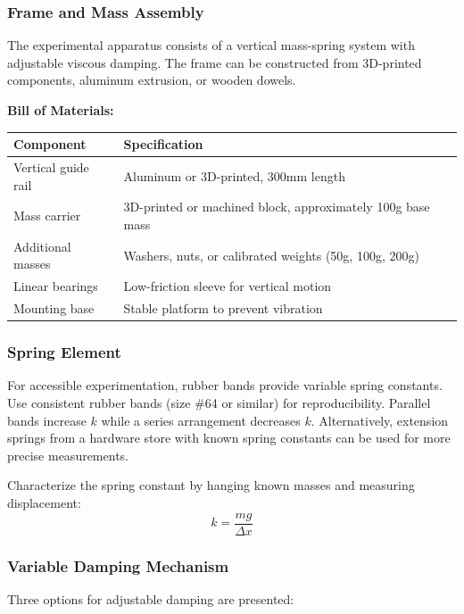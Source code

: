\subsubsection{Frame and Mass Assembly}

The experimental apparatus consists of a vertical mass-spring system with adjustable viscous damping. The frame can be constructed from 3D-printed components, aluminum extrusion, or wooden dowels.

\textbf{Bill of Materials:}

\begin{center}
\begin{tabular}{lp{8cm}}
\toprule
\textbf{Component} & \textbf{Specification} \\
\midrule
Vertical guide rail & Aluminum or 3D-printed, 300mm length \\
Mass carrier & 3D-printed or machined block, approximately 100g base mass \\
Additional masses & Washers, nuts, or calibrated weights (50g, 100g, 200g) \\
Linear bearings & Low-friction sleeve for vertical motion \\
Mounting base & Stable platform to prevent vibration \\
\bottomrule
\end{tabular}
\end{center}

\subsubsection{Spring Element}

For accessible experimentation, rubber bands provide variable spring constants. Use consistent rubber bands (size \#64 or similar) for reproducibility. Parallel bands increase $k$ while a series arrangement decreases $k$. Alternatively, extension springs from a hardware store with known spring constants can be used for more precise measurements.

Characterize the spring constant by hanging known masses and measuring displacement:
\begin{equation}
k = \frac{mg}{\Delta x}
\end{equation}

\subsubsection{Variable Damping Mechanism}

Three options for adjustable damping are presented:

